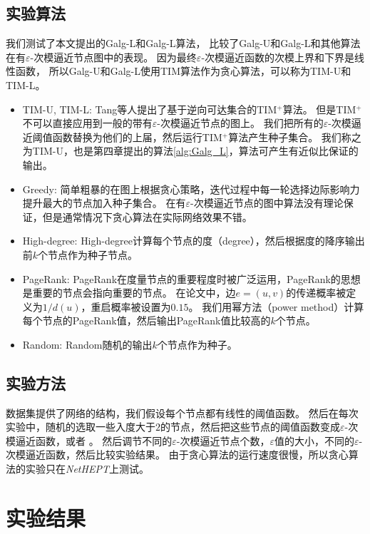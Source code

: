 \subsection{实验算法}
我们测试了本文提出的\textsf{Galg-L}和\textsf{Galg-L}算法，
比较了\textsf{Galg-U}和\textsf{Galg-L}和其他算法在有$\varepsilon$-次模逼近节点图中的表现。
因为最终$\varepsilon$-次模逼近函数的次模上界和下界是线性函数，
所以\textsf{Galg-U}和\textsf{Galg-L}使用TIM算法作为贪心算法，可以称为\textsf{TIM-U}和\textsf{TIM-L}。


\begin{itemize}
\item {\sf TIM-U, TIM-L:}
Tang等人\cite{tang2014newrrset}提出了基于逆向可达集合的{\sf TIM$^+$}算法。
但是{\sf TIM$^+$}不可以直接应用到一般的带有$\varepsilon$-次模逼近节点的图上。
我们把所有的$\varepsilon$-次模逼近阈值函数替换为他们的上届，然后运行{\sf TIM$^+$}算法产生种子集合。
我们称之为{\sf TIM-U}，也是第四章提出的算法\ref{alg:Galg_L}，算法可产生有近似比保证的输出。
\item {\sf Greedy:} 简单粗暴的在图上根据贪心策略，迭代过程中每一轮选择边际影响力提升最大的节点加入种子集合。
在有$\varepsilon$-次模逼近节点的图中算法没有理论保证，但是通常情况下贪心算法在实际网络效果不错。
\item {\sf High-degree:} {\sf High-degree}计算每个节点的度（degree），然后根据度的降序输出前$k$个节点作为种子节点。
\item {\sf PageRank:} PageRank在度量节点的重要程度时被广泛运用，PageRank的思想是重要的节点会指向重要的节点。
在论文中，边$e=(u,v)$的传递概率被定义为$1/d(u)$，重启概率被设置为$0.15$。
我们用幂方法（power method）计算每个节点的PageRank值，然后输出PageRank值比较高的$k$个节点。
\item {\sf Random:} {\sf Random}随机的输出$k$个节点作为种子。
\end{itemize}

\subsection{实验方法}

数据集提供了网络的结构，我们假设每个节点都有线性的阈值函数。
然后在每次实验中，随机的选取一些入度大于$2$的节点，然后把这些节点的阈值函数变成$\varepsilon$-次模逼近函数，\easso 或者 \easst。
然后调节不同的$\varepsilon$-次模逼近节点个数，$\varepsilon$值的大小，不同的$\varepsilon$-次模逼近函数，然后比较实验结果。
由于贪心算法的运行速度很慢，所以贪心算法的实验只在{\em NetHEPT}上测试。


\section{实验结果}


